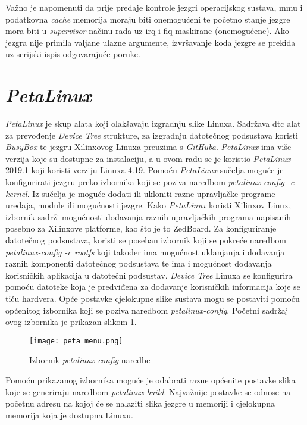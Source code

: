 \documentclass[times, utf8, diplomski, numeric]{fer}
\begin{document}
Važno je napomenuti da prije predaje kontrole jezgri operacijskog sustava, \gls{mmu} i podatkovna \textit{cache} memorija moraju biti
onemogućeni te početno stanje jezgre mora biti u \textit{supervisor} načinu rada uz \gls{irq} i \gls{fiq} maskirane (onemogućene). Ako
jezgra nije primila valjane ulazne argumente, izvršavanje koda jezgre se prekida uz serijski ispis odgovarajuće poruke.

\section{\textit{PetaLinux}}
\textit{PetaLinux} je skup alata koji olakšavaju izgradnju slike Linuxa. Sadržava \gls{dtc} alat za prevođenje \textit{Device Tree}
strukture, za izgradnju datotečnog podsustava koristi \textit{BusyBox} te jezgru Xilinxovog Linuxa preuzima s \textit{GitHuba}.
\textit{PetaLinux} ima više verzija koje su dostupne za instalaciju, a u ovom radu se je koristio \textit{PetaLinux} 2019.1 koji
koristi verziju Linuxa 4.19. Pomoću \textit{PetaLinux} sučelja moguće je konfigurirati jezgru preko izbornika koji se poziva
naredbom \textit{petalinux-config -c kernel}. Iz sučelja je moguće dodati ili ukloniti razne upravljačke programe uređaja,
module ili mogućnosti jezgre. Kako \textit{PetaLinux} koristi Xilinxov Linux, izbornik sadrži mogućnosti dodavanja raznih
upravljačkih programa napisanih posebno za Xilinxove platforme, kao što je to ZedBoard. Za konfiguriranje datotečnog podsustava,
koristi se poseban izbornik koji se pokreće naredbom \textit{petalinux-config -c rootfs} koji također ima mogućnost uklanjanja
i dodavanja raznih komponenti datotečnog podsustava te ima i mogućnost dodavanja korisničkih aplikacija u datotečni  podsustav.
\textit{Device Tree} Linuxa se konfigurira pomoću datoteke koja je predviđena za dodavanje korisničkih informacija koje se tiču
hardvera. Opće postavke cjelokupne slike sustava mogu se postaviti pomoću općenitog izbornika koji se poziva naredbom
\textit{petalinux-config}. Početni sadržaj ovog izbornika je prikazan slikom \ref{peta_menu}.
\begin{figure}[H]
  \centering
	\texttt{[image: peta\_menu.png]}%
	\caption{Izbornik \textit{petalinux-config} naredbe}
	\label{peta_menu}%
\end{figure}
Pomoću prikazanog izbornika
moguće je odabrati razne općenite postavke slika koje se generiraju naredbom \textit{petalinux-build}. Najvažnije postavke
se odnose na početnu adresu na kojoj će se nalaziti slika jezgre u memoriji i cjelokupna memorija koja je dostupna Linuxu.
\end{document}
